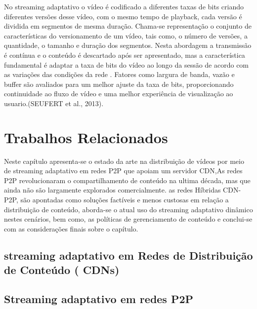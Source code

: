 \documentclass[
	12pt,				%
	oneside,			%
	a4paper,			%
	english,			%
	brazil				%
	]{abntex2ppgsi}
\begin{document}
No streaming adaptativo o vídeo é codificado a diferentes taxas de bits  criando diferentes versões desse vídeo, com o mesmo tempo de playback, cada versão é dividida em segmentos de mesma duração. Chama-se representação o conjunto de características do versionamento de um vídeo, tais como, o número de versões, a quantidade, o tamanho e duração dos segmentos. Nesta abordagem a transmissão é contínua e o conteúdo é descartado após ser apresentado, mas a característica fundamental é adaptar a taxa de bits do vídeo ao longo da sessão de acordo com as variações das condições da rede . Fatores como largura de banda, vazão e buffer são avaliados para um melhor ajuste da taxa de bits, proporcionando continuidade ao fluxo de vídeo e uma melhor experiência de visualização ao usuario.(SEUFERT et al., 2013).



\chapter{Trabalhos Relacionados}

Neste capítulo apresenta-se o estado da arte na distribuição de vídeos por meio de streaming adaptativo em redes P2P que apoiam um servidor CDN,As redes P2P revolucionaram o compartilhamento de conteúdo na ultima década, mas que ainda não são largamente explorados comercialmente. as redes Híbridas CDN-P2P, são apontadas como soluções factíveis e menos custosas em relação a distribuição de conteúdo, aborda-se o atual uso do streaming adaptativo dinâmico nestes cenários, bem como, as políticas de gerenciamento de conteúdo e conclui-se com as considerações finais sobre o capítulo.




\section{streaming adaptativo em Redes de Distribuição de Conteúdo ( CDNs)}



\section{Streaming adaptativo em redes P2P}
\end{document}
